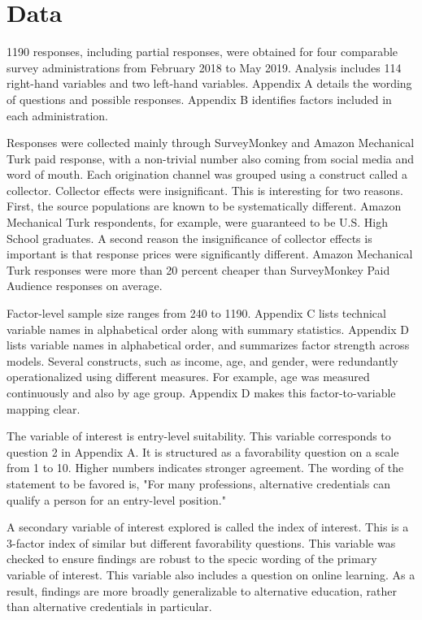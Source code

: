 \documentclass[AER]{./aea-latex-templates/AEA}
\begin{document}
        \section{Data}
        
        1190 responses, including partial responses, were obtained for four
        comparable survey administrations from February 2018 to May 2019.
        Analysis includes 114 right-hand variables and two left-hand variables.
        Appendix A details the wording of questions and possible responses.
        Appendix B identifies factors included in each administration.

        Responses were collected mainly through SurveyMonkey and Amazon Mechanical
        Turk paid response, with a non-trivial number also coming from social media
        and word of mouth. Each origination channel was grouped using a construct
        called a collector. Collector effects were insignificant. This is
        interesting for two reasons. First, the source
        populations are known to be systematically different. Amazon Mechanical Turk
        respondents, for example, were guaranteed to be U.S. High School graduates. A second
        reason the insignificance of collector effects is important is that
        response prices were significantly different. Amazon Mechanical Turk
        responses were more than 20 percent cheaper than SurveyMonkey Paid Audience
        responses on average.
        
        Factor-level sample size ranges from 240 to 1190. Appendix C lists
        technical variable names in alphabetical order along with summary
        statistics. Appendix D lists variable names in alphabetical order, and
        summarizes factor strength across models.
        Several constructs, such as income, age, and gender, were redundantly
        operationalized using different measures. For example, age was measured
        continuously and also by age group. Appendix D makes this
        factor-to-variable mapping clear.
        
        The variable of interest is entry-level suitability.
        This variable corresponds to question 2 in Appendix A.
        It is structured as a favorability question on a scale from 1 to 10. Higher numbers indicates stronger agreement.
        The wording of the statement to be favored is, "For many professions, alternative credentials can qualify a person for an entry-level position."
        
        A secondary variable of interest explored is called the index of interest.
        This is a 3-factor index of similar but different favorability questions.
        This variable was checked to ensure findings are robust to the specic wording of the primary variable of interest.
        This variable also includes a question on online learning. As a result, findings are more broadly generalizable
        to alternative education, rather than alternative credentials in particular.
        
\end{document}
